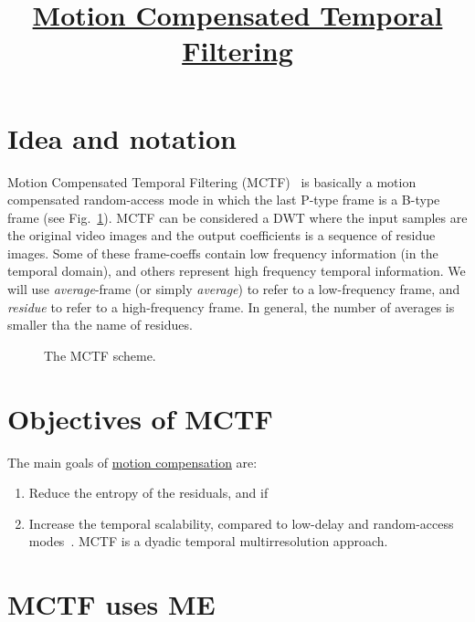 
\title{\href{https://github.com/vicente-gonzalez-ruiz/MCTF}{Motion Compensated Temporal Filtering}}

\maketitle

\section{Idea and notation}

Motion Compensated Temporal Filtering (MCTF)~\cite{ohm1994three} is
basically a motion compensated random-access mode in which the last
P-type frame is a B-type frame (see Fig.~\ref{fig:MCTF}). MCTF can be
considered a DWT where the input samples are the original video images
and the output coefficients is a sequence of residue images. Some of
these frame-coeffs contain low frequency information (in the temporal
domain), and others represent high frequency temporal information. We
will use \emph{average}-frame (or simply \emph{average}) to refer to a
low-frequency frame, and \emph{residue} to refer to a high-frequency
frame. In general, the number of averages is smaller tha the name of
residues.

\begin{figure}
  \caption{The MCTF scheme.}
  \label{fig:MCTF}
\end{figure}


\section{Objectives of MCTF}

The main goals of
\href{https://en.wikipedia.org/wiki/Motion_compensation}{motion
  compensation} are:
\begin{enumerate}
\item Reduce the entropy of the residuals, and if
\item Increase the temporal scalability, compared to low-delay and
  random-access modes~\cite{vruiz__MC}. MCTF is a
  dyadic temporal multirresolution approach.
\end{enumerate}
  

\section{MCTF uses ME}

